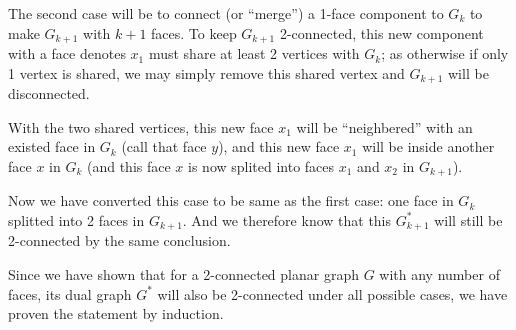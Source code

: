 \documentclass[11pt]{article}
\begin{document}
The second case will be to connect (or ``merge'') a 1-face component to $G_k$ to make $G_{k+1}$ with $k+1$ faces. To keep $G_{k+1}$ 2-connected, this new component with a face denotes $x_1$ must share at least 2 vertices with $G_k$; as otherwise if only 1 vertex is shared, we may simply remove this shared vertex and $G_{k+1}$ will be disconnected.

With the two shared vertices, this new face $x_1$ will be ``neighbered'' with an existed face in $G_k$ (call that face $y$), and this new face $x_1$ will be inside another face $x$ in $G_k$ (and this face $x$ is now splited into faces $x_1$ and $x_2$ in $G_{k+1}$).

Now we have converted this case to be same as the first case: one face in $G_k$ splitted into 2 faces in $G_{k+1}$. And we therefore know that this $G^*_{k+1}$ will still be 2-connected by the same conclusion.\newline

Since we have shown that for a 2-connected planar graph $G$ with any number of faces, its dual graph $G^*$ will also be 2-connected under all possible cases, we have proven the statement by induction.





%
% 
% 
\end{document}
